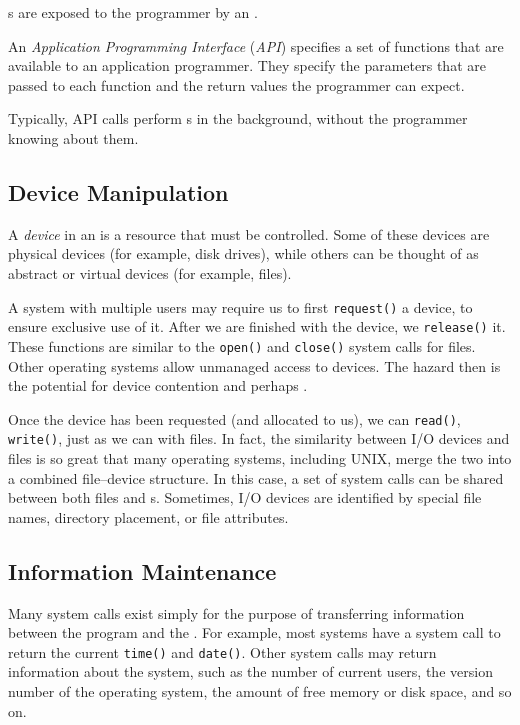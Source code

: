 s are exposed to the programmer by an .
\begin{definition}\label{def:API}
  An \emph{Application Programming Interface} (\emph{API}) specifies a set of functions that are available to an application programmer.
  They specify the parameters that are passed to each function and the return values the programmer can expect.

  Typically, API calls perform s in the background, without the programmer knowing about them.
\end{definition}



\subsection{Device Manipulation}\label{subsec:Device_Manipulation}
\begin{definition}[Device]\label{def:Device}
  A \emph{device} in an  is a resource that must be controlled.
  Some of these devices are physical devices (for example, disk drives), while others can be thought of as abstract or virtual devices (for example, files).
\end{definition}

A system with multiple users may require us to first \texttt{request()} a device, to ensure exclusive use of it.
After we are finished with the device, we \texttt{release()} it.
These functions are similar to the \texttt{open()} and \texttt{close()} system calls for files.
Other operating systems allow unmanaged access to devices.
The hazard then is the potential for device contention and perhaps .

Once the device has been requested (and allocated to us), we can \texttt{read()}, \texttt{write()}, just as we can with files.
In fact, the similarity between I/O devices and files is so great that many operating systems, including UNIX, merge the two into a combined file–device structure.
In this case, a set of system calls can be shared between both files and s.
Sometimes, I/O devices are identified by special file names, directory placement, or file attributes.

\subsection{Information Maintenance}\label{subsec:Information_Maintenance}
Many system calls exist simply for the purpose of transferring information between the  program and the .
For example, most systems have a system call to return the current \texttt{time()} and \texttt{date()}.
Other system calls may return information about the system, such as the number of current users, the version number of the operating system, the amount of free memory or disk space, and so on.

